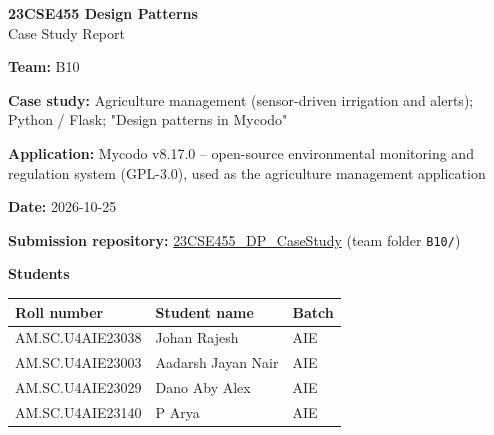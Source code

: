 \documentclass[11pt,a4paper]{article}
\newcommand{\field}[2]{\textbf{#1:} #2\par}
\begin{document}
\begin{center}\Large\textbf{23CSE455 Design Patterns}\\[4pt]\LARGE Case Study Report\end{center}

\field{Team}{B10}
\field{Case study}{Agriculture management (sensor-driven irrigation and alerts); Python / Flask; "Design patterns in Mycodo"}
\field{Application}{Mycodo v8.17.0 -- open-source environmental monitoring and regulation system (GPL-3.0), used as the agriculture management application}
\field{Date}{2026-10-25}
\textbf{Submission repository:} \href{https://github.com/aswathymohan-amrita/23CSE455_DP_CaseStudy}{23CSE455\_DP\_CaseStudy} (team folder \texttt{B10/})\par
\textbf{Students}\par
\begin{tabularx}{\linewidth}{@{}llX@{}}\toprule
Roll number & Student name & Batch\\\midrule
AM.SC.U4AIE23038 & Johan Rajesh & AIE\\
AM.SC.U4AIE23003 & Aadarsh Jayan Nair & AIE\\
AM.SC.U4AIE23029 & Dano Aby Alex & AIE\\
AM.SC.U4AIE23140 & P Arya & AIE\\\bottomrule
\end{tabularx}
\end{document}
